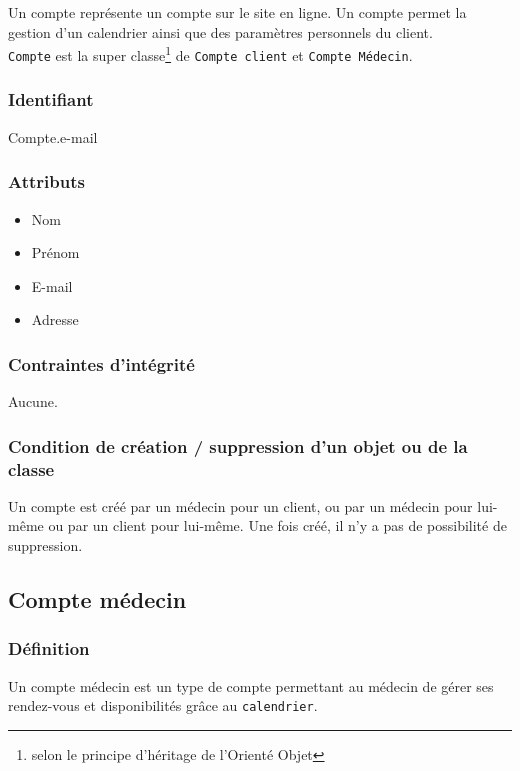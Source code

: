\documentclass[a4paper, 11pt]{report}
\begin{document}
Un compte représente un compte sur le site en ligne. Un compte permet la gestion 
d'un calendrier ainsi que des paramètres personnels du client. \\
\texttt{Compte} est la super classe\footnote{selon le principe d'héritage de
l'Orienté Objet} de \texttt{Compte client} et \texttt{Compte Médecin}. 

\subsubsection{Identifiant}

Compte.e-mail

\subsubsection{Attributs}

\begin{itemize}
    \item Nom
    \item Prénom
    \item E-mail
    \item Adresse
\end{itemize}

\subsubsection{Contraintes d'intégrité}

Aucune.

\subsubsection{Condition de création / suppression d'un objet ou de la classe}

Un compte est créé par un médecin pour un client, ou par un médecin pour lui-même
ou par un client pour lui-même.
Une fois créé, il n'y a pas de possibilité de suppression.


\subsection{Compte médecin}

\subsubsection{Définition}

Un compte médecin est un type de compte permettant au médecin de gérer ses rendez-vous et disponibilités
grâce au \texttt{calendrier}.
\end{document}
